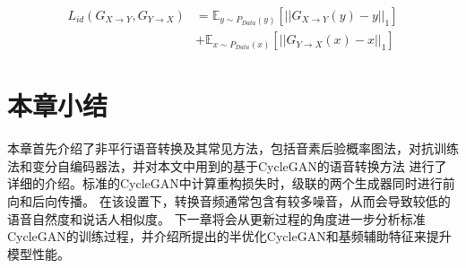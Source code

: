 \begin{align}
    L_{id}(G_{X\rightarrow Y},G_{Y\rightarrow X}) & = \mathbb{E}_{y\sim P_{Data}(y)}\left[\left| \left| G_{X\rightarrow Y}(y)-y\right| \right|_1 \right] \\
    & + \mathbb{E}_{x\sim P_{Data}(x)}\left[\left| \left| G_{Y\rightarrow X}(x)-x\right| \right|_1 \right]
\end{align}

\section{本章小结}
本章首先介绍了非平行语音转换及其常见方法，包括音素后验概率图法，对抗训练法和变分自编码器法，并对本文中用到的基于CycleGAN的语音转换方法
进行了详细的介绍。标准的CycleGAN中计算重构损失时，级联的两个生成器同时进行前向和后向传播。
在该设置下，转换音频通常包含有较多噪音，从而会导致较低的语音自然度和说话人相似度。
下一章将会从更新过程的角度进一步分析标准CycleGAN的训练过程，并介绍所提出的半优化CycleGAN和基频辅助特征来提升模型性能。
